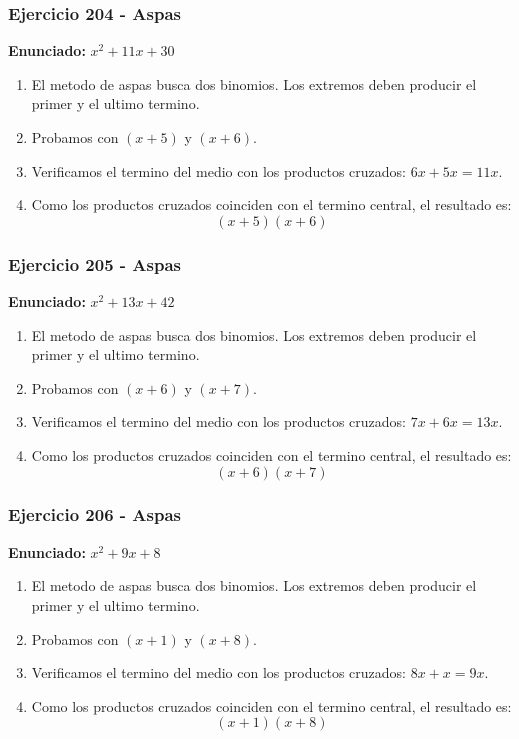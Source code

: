 \documentclass[11pt,a4paper]{article}
\begin{document}
\vspace{0.2cm}
\subsubsection*{Ejercicio 204 - Aspas}
\textbf{Enunciado:} $ x^{2} + 11 x + 30 $\par
\begin{enumerate}[leftmargin=2em]
\item El metodo de aspas busca dos binomios. Los extremos deben producir el primer y el ultimo termino.
\item Probamos con \((x + 5)\) y \((x + 6)\).
\item Verificamos el termino del medio con los productos cruzados: \(6 x+5 x=11 x\).
\item Como los productos cruzados coinciden con el termino central, el resultado es: \[\boxed{\left(x + 5\right)\left(x + 6\right)}\]
\end{enumerate}

\vspace{0.2cm}
\subsubsection*{Ejercicio 205 - Aspas}
\textbf{Enunciado:} $ x^{2} + 13 x + 42 $\par
\begin{enumerate}[leftmargin=2em]
\item El metodo de aspas busca dos binomios. Los extremos deben producir el primer y el ultimo termino.
\item Probamos con \((x + 6)\) y \((x + 7)\).
\item Verificamos el termino del medio con los productos cruzados: \(7 x+6 x=13 x\).
\item Como los productos cruzados coinciden con el termino central, el resultado es: \[\boxed{\left(x + 6\right)\left(x + 7\right)}\]
\end{enumerate}

\vspace{0.2cm}
\subsubsection*{Ejercicio 206 - Aspas}
\textbf{Enunciado:} $ x^{2} + 9 x + 8 $\par
\begin{enumerate}[leftmargin=2em]
\item El metodo de aspas busca dos binomios. Los extremos deben producir el primer y el ultimo termino.
\item Probamos con \((x + 1)\) y \((x + 8)\).
\item Verificamos el termino del medio con los productos cruzados: \(8 x+x=9 x\).
\item Como los productos cruzados coinciden con el termino central, el resultado es: \[\boxed{\left(x + 1\right)\left(x + 8\right)}\]
\end{enumerate}
\end{document}
